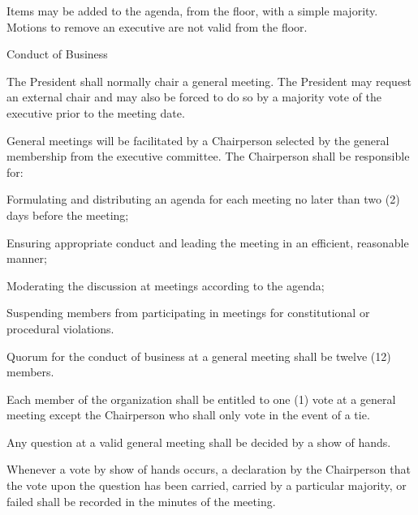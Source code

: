 \documentclass[12pt,a4paper]{article}
\begin{document}
\begin{constitutionlist}
\begin{constitutionlist}
\item Items may be added to the agenda, from the floor, with a simple majority. Motions to remove an executive are not valid from the floor.
\end{constitutionlist}

\item Conduct of Business

\begin{constitutionlist}
\item The President shall normally chair a general meeting. The President may request an external chair and may also be forced to do so by a majority vote of the executive prior to the meeting date.  

\item General meetings will be facilitated by a Chairperson selected by the general membership from the executive committee.
The Chairperson shall be responsible for:

\begin{constitutionlist}
\item Formulating and distributing an agenda for each meeting no later than two (2) days before the meeting;

\item Ensuring appropriate conduct and leading the meeting in an efficient, reasonable manner;

\item Moderating the discussion at meetings according to the agenda;

\item Suspending members from participating in meetings for constitutional or procedural violations.
\end{constitutionlist}

\item Quorum for the conduct of business at a general meeting shall be twelve (12) members.

\item Each member of the organization shall be entitled to one (1) vote at a general meeting except the
Chairperson who shall only vote in the event of a tie.

\item Any question at a valid general meeting shall be decided by a show of hands.

\item Whenever a vote by show of hands occurs, a declaration by the Chairperson that the vote upon the question has been carried, carried by a particular majority, or failed shall be recorded in the minutes of the meeting.


\end{constitutionlist}
\end{constitutionlist}
\end{document}

